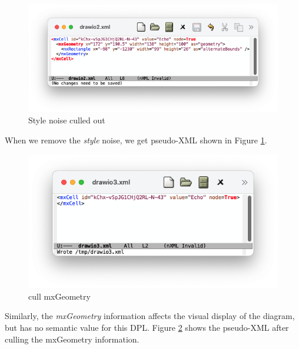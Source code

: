\documentclass[10pt,anonymous,review]{acmart}
\begin{document}
\vspace{1\baselineskip}

\begin{figure}
   \centering
    \includegraphics[trim=1cm 1.9cm 1cm 1cm, clip, scale=0.4]{./media/drawio2.png}
    \caption{Style noise culled out}
    \label{drawio2}
\end{figure}
When we remove the \emph{style} noise, we get pseudo-XML shown in Figure \ref{drawio2}.

 \vspace{6\baselineskip}

\begin{figure}
   \centering
    \includegraphics[trim=1cm 1.9cm 1cm 1cm, clip, scale=0.4]{./media/drawio3.png}
    \caption{cull mxGeometry}
    \label{drawio3}
\end{figure}
\vspace{0.5\baselineskip}
Similarly, the \emph{mxGeometry} information affects the visual display of the diagram, but has no semantic value for this DPL.
Figure \ref{drawio3} shows the pseudo-XML after culling the mxGeometry information.
  
 \vspace{5\baselineskip}
\end{document}
